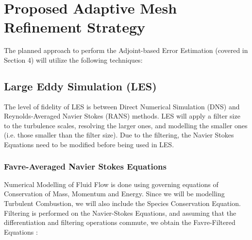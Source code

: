 \documentclass[titlepage,11pt,letterpaper]{article}
\begin{document}
\section{Proposed Adaptive Mesh Refinement Strategy}

The planned approach to perform the Adjoint-based Error Estimation (covered in Section 4) will utilize the following techniques:\par

\subsection{Large Eddy Simulation (LES)}
The level of fidelity of LES is between Direct Numerical Simulation (DNS) and Reynolds-Averaged Navier Stokes (RANS) methods. LES will apply a filter size to the turbulence scales, resolving the larger 
ones, and modelling the smaller ones (i.e. those smaller than the filter size). Due to the filtering, the Navier Stokes Equations need to be modified before being used in LES.\par  


\subsubsection{Favre-Averaged Navier Stokes Equations}
Numerical Modelling of Fluid Flow is done using governing equations of Conservation of Mass, Momentum and Energy. Since we will be modelling Turbulent Combustion, we will also include the Species Conservation Equation. Filtering is performed on the Navier-Stokes Equations, and assuming that the differentiation and filtering operations commute, we obtain the Favre-Filtered Equations \cite{HPerez:2011}:\par
\end{document}
